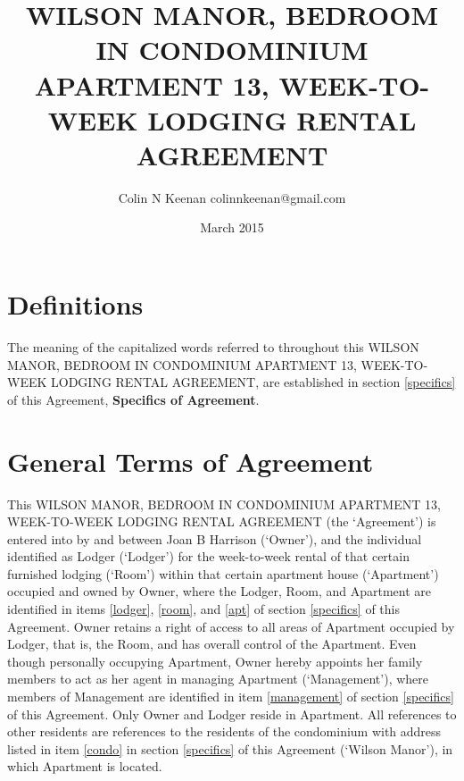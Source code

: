 \documentclass[12pt,letterpaper]{article}
\newcommand{\agreementtitle}{WILSON MANOR, BEDROOM IN CONDOMINIUM APARTMENT 13, WEEK-TO-WEEK LODGING RENTAL AGREEMENT}
\newcommand{\definitions}{Definitions} %
\newcommand{\generals}{General Terms of Agreement}	%
\newcommand{\specifics}{Specifics of Agreement}			%
\newcommand{\mom}{Joan B Harrison}
\newcommand{\management}{Management}
\newcommand{\condo}{Wilson Manor}
\newcommand{\apt}{Apartment}
\newcommand{\room}{Room}
\newcommand{\lodger}{Lodger}
\begin{document}
\title{\agreementtitle{}}
\author{Colin N Keenan colinnkeenan@gmail.com}
\date{March 2015}
\maketitle
\thispagestyle{fancy}

\noindent \hrulefill
\section{\definitions{}} \label{definitions}
The meaning of the capitalized words referred to throughout this \agreementtitle{}, are established in section \ref{specifics} of this Agreement, \textbf{\specifics{}}.
\section{\generals{}} \label{generals}
This \agreementtitle{} (the `Agreement') is entered into by and between \mom{} (`Owner'), and the individual identified as \lodger{} (`\lodger{}') for the week-to-week rental of that certain furnished lodging (`\room{}') within that certain apartment house (`\apt{}') occupied and owned by Owner, where the \lodger{}, \room{}, and \apt{} are identified in items \ref{lodger}, \ref{room}, and \ref{apt} of section \ref{specifics} of this Agreement. Owner retains a right of access to all areas of \apt{} occupied by \lodger{}, that is, the \room{}, and has overall control of the \apt{}. Even though personally occupying \apt{}, Owner hereby appoints her family members to act as her agent in managing \apt{} (`\management{}'), where members of \management{} are identified in item \ref{management} of section \ref{specifics} of this Agreement. Only Owner and \lodger{} reside in \apt{}. All references to other residents are references to the residents of the condominium with address listed in item \ref{condo} in section \ref{specifics} of this Agreement (`\condo{}'), in which \apt{} is located.
\end{document}
